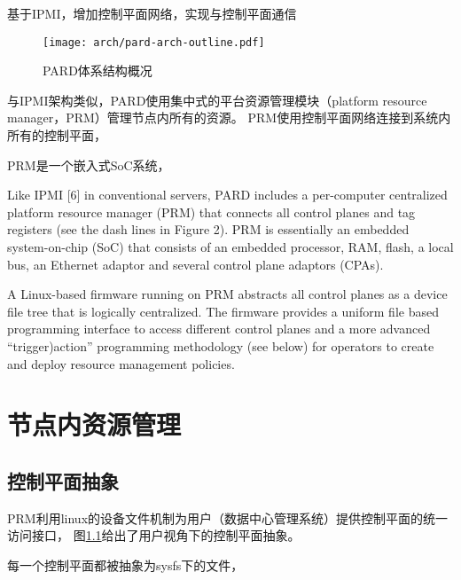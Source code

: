 基于IPMI，增加控制平面网络，实现与控制平面通信

\begin{figure}[tbh]
  \centering
  \texttt{[image: arch/pard-arch-outline.pdf]}
  \caption[PARD体系结构概况]{PARD体系结构概况}
  \label{fig:pard-arch-outline}
\end{figure}

与IPMI架构类似，PARD使用集中式的平台资源管理模块（platform resource manager，PRM）管理节点内所有的资源。
PRM使用控制平面网络连接到系统内所有的控制平面，

PRM是一个嵌入式SoC系统，


Like IPMI [6] in conventional servers, PARD includes a
per-computer centralized platform resource manager (PRM) that
connects all control planes and tag registers (see the dash lines in
Figure 2). PRM is essentially an embedded system-on-chip (SoC)
that consists of an embedded processor, RAM, flash, a local bus, an
Ethernet adaptor and several control plane adaptors (CPAs).

A Linux-based firmware running on PRM abstracts all control
planes as a device file tree that is logically centralized. The
firmware provides a uniform file based programming interface to
access different control planes and a more advanced “trigger)action”
programming methodology (see below) for operators to create and
deploy resource management policies.


\section{节点内资源管理}

\subsection{控制平面抽象}

PRM利用linux的设备文件机制为用户（数据中心管理系统）提供控制平面的统一访问接口，
图\ref{}给出了用户视角下的控制平面抽象。

每一个控制平面都被抽象为sysfs\cite{}下的文件，

